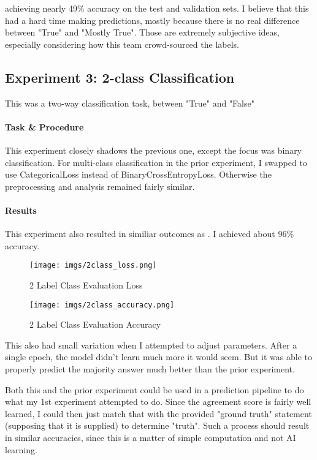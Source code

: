 \documentclass[14]{article}
\begin{document}
achieving nearly 49\% accuracy on the test and validation sets. I believe that this had a hard time making predictions, mostly because there is no real difference between "True" and "Mostly True". Those are extremely subjective ideas, especially considering how this team crowd-sourced the labels.

\subsection{Experiment 3: 2-class Classification}

This was a two-way classification task, between "True" and "False"

\paragraph{Task \& Procedure}

This experiment closely shadows the previous one, except the focus was binary classification. 
For multi-class classification in the prior experiment, I swapped to use CategoricalLoss instead of BinaryCrossEntropyLoss. Otherwise the preprocessing and analysis remained fairly similar.

\paragraph{Results}

This experiment also resulted in similiar outcomes as \citet{truthseeker}. I achieved about 96\% accuracy.

\begin{figure}[ht]
    \centering
    \texttt{[image: imgs/2class\_loss.png]}
    \caption{2 Label Class Evaluation Loss}
    \label{fig:2class_loss}
\end{figure}

\begin{figure}[ht]
    \centering
    \texttt{[image: imgs/2class\_accuracy.png]}
    \caption{2 Label Class Evaluation Accuracy}
    \label{fig:2class_accuracy}
\end{figure}

This also had small variation when I attempted to adjust parameters. After a single epoch, the model didn't learn much more it would seem. But it was able to properly predict the majority answer much better than the prior experiment.

Both this and the prior experiment could be used in a prediction pipeline to do what my 1st experiment attempted to do. Since the agreement score is fairly well learned, I could then just match that with the provided "ground truth" statement (supposing that it is supplied) to determine "truth". Such a process should result in similar accuracies, since this is a matter of simple computation and not AI learning.
\end{document}
